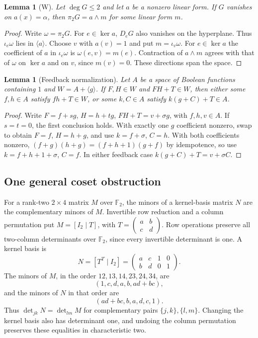 \documentclass[11pt,a4paper]{article}
\theoremstyle{plain}
\newtheorem{lemma}[theorem]{Lemma}
\theoremstyle{remark}
\theoremstyle{plain}
\newcommand{\F}{\mathbb F_2}
\begin{document}
\begin{lemma}[W]\label{toolkit:w}
Let $\deg G\le2$ and let $a$ be a nonzero linear form. If $G$ vanishes on $a(x)=\alpha$, then $\pi_2G=a\wedge m$ for some linear form $m$.
\end{lemma}
\begin{proof}
Write $\omega=\pi_2G$. For $e\in\ker a$, $D_eG$ also vanishes on the hyperplane. Thus $\iota_e\omega$ lies in $\langle a\rangle$. Choose $v$ with $a(v)=1$ and put $m=\iota_v\omega$. For $e\in\ker a$ the coefficient of $a$ in $\iota_e\omega$ is $\omega(e,v)=m(e)$. Contraction of $a\wedge m$ agrees with that of $\omega$ on $\ker a$ and on $v$, since $m(v)=0$. These directions span the space.
\end{proof}

\begin{lemma}[Feedback normalization]\label{toolkit:feedback}
Let $A$ be a space of Boolean functions containing $1$ and $W=A+\langle g\rangle$. If $F,H\in W$ and $FH+T\in W$, then either some $f,h\in A$ satisfy $fh+T\in W$, or some $k,C\in A$ satisfy $k(g+C)+T\in A$.
\end{lemma}
\begin{proof}
Write $F=f+sg$, $H=h+tg$, $FH+T=v+\sigma g$, with $f,h,v\in A$.
If $s=t=0$, the first conclusion holds. With exactly one $g$ coefficient nonzero, swap to obtain $F=f$, $H=h+g$, and use $k=f+\sigma$, $C=h$. With both coefficients nonzero,
$(f+g)(h+g)=(f+h+1)(g+f)$ by idempotence, so use $k=f+h+1+\sigma$, $C=f$. In either feedback case $k(g+C)+T=v+\sigma C$.
\end{proof}


\subsection{One general coset obstruction}

For a rank-two $2\times4$ matrix $M$ over $\F$, the minors of a kernel-basis matrix $N$ are the complementary minors of $M$. Invertible row reduction and a column permutation put $M=[I_2\mid T]$, with $T=\left(\begin{smallmatrix}a&b\\c&d\end{smallmatrix}\right)$. Row operations preserve all two-column determinants over $\F$, since every invertible determinant is one. A kernel basis is
\[
N=[T^T\mid I_2]=\begin{pmatrix}a&c&1&0\\b&d&0&1\end{pmatrix}.
\]
The minors of $M$, in the order $12,13,14,23,24,34$, are
\[
(1,c,d,a,b,ad+bc),
\]
and the minors of $N$ in that order are
\[
(ad+bc,b,a,d,c,1).
\]
Thus $\det_{jk}N=\det_{lm}M$ for complementary pairs $\{j,k\},\{l,m\}$. Changing the kernel basis also has determinant one, and undoing the column permutation preserves these equalities in characteristic two.
\end{document}
